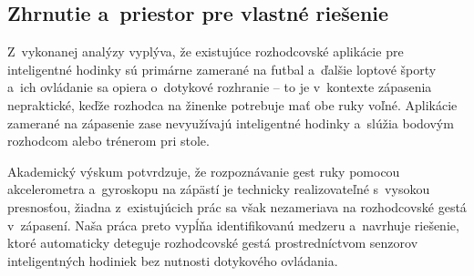 \subsection{Zhrnutie a~priestor pre vlastné riešenie}

Z~vykonanej analýzy vyplýva, že existujúce rozhodcovské
aplikácie pre inteligentné hodinky sú primárne zamerané na futbal
a~ďalšie loptové športy a~ich ovládanie sa opiera o~dotykové
rozhranie -- to je v~kontexte zápasenia nepraktické, keďže
rozhodca na žinenke potrebuje mať obe ruky voľné. Aplikácie
zamerané na zápasenie zase nevyužívajú inteligentné hodinky a~slúžia
bodovým rozhodcom alebo trénerom pri stole.

Akademický výskum potvrdzuje, že rozpoznávanie gest ruky
pomocou akcelerometra a~gyroskopu na zápästí je technicky
realizovateľné s~vysokou presnosťou, žiadna z~existujúcich
prác sa však nezameriava na rozhodcovské gestá v~zápasení.
Naša práca preto vypĺňa identifikovanú medzeru a~navrhuje
riešenie, ktoré automaticky deteguje rozhodcovské gestá
prostredníctvom senzorov inteligentných hodiniek bez
nutnosti dotykového ovládania.